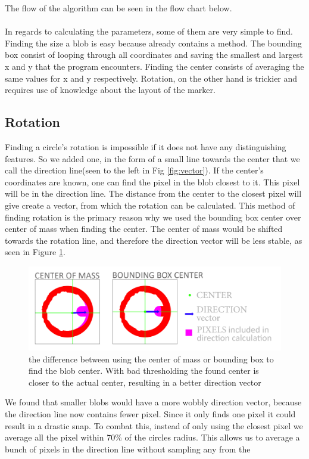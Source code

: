 The flow of the algorithm can be seen in the flow chart below.
\\\\
In regards to calculating the parameters, some of them are very simple to find. Finding the size a blob is easy because  already contains a  method. The bounding box consist of looping through all coordinates and saving the smallest and largest x and y that the program encounters. Finding the center consists of averaging the same values for x and y respectively. Rotation, on the other hand is trickier and requires use of knowledge about the layout of the marker.  
\subsection{Rotation}
Finding a circle's rotation is impossible if it does not have any distinguishing features. So we added one, in the form of a small line towards the center that we call the direction line(seen to the left in Fig \ref{fig:vector}). If the center's coordinates are known, one can find the pixel in the blob closest to it. This pixel will be in the direction line. The distance from the center to the closest pixel will give create a vector, from which the rotation can be calculated. This method of finding rotation is the primary reason why we used the bounding box center over center of mass when finding the center. The center of mass would be shifted towards the rotation line, and therefore the direction vector will be less stable, as seen in Figure \ref{fig:boundbox}.\\
\begin{figure}
	\centering
	\includegraphics[width=1\linewidth]{figure/Analysis/boundingbox.png}
	\caption{the difference between using the center of mass or bounding box to find the blob center. With bad thresholding the found center is closer to the actual center, resulting in a better direction vector} 
	\label{fig:boundbox}
\end{figure}
We found that smaller blobs would have a more wobbly direction vector, because the direction line now contains fewer pixel. Since it only finds one pixel it could result in a drastic snap. To combat this, instead of only using the closest pixel we average all the pixel within 70\% of the circles radius. This allows us to average a bunch of pixels in the direction line without sampling any from the
